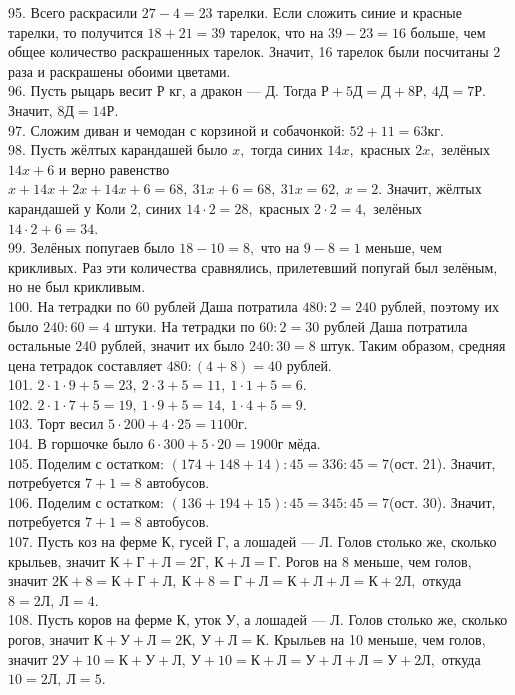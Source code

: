 \documentclass[12pt]{article}
\begin{document}
95. Всего раскрасили $27-4=23$ тарелки. Если сложить синие и красные тарелки, то получится $18+21=39$ тарелок, что на $39-23=16$ больше, чем общее количество раскрашенных тарелок. Значит, 16 тарелок были посчитаны 2 раза и раскрашены обоими цветами.\\
96. Пусть рыцарь весит Р кг, а дракон --- Д. Тогда $\text{Р}+5\text{Д}=\text{Д}+8\text{Р},\ 4\text{Д}=7\text{Р}.$ Значит, $8\text{Д}=14\text{Р}.$\\
97. Сложим диван и чемодан с корзиной и собачонкой: $52+11=63$кг.\\
98. Пусть жёлтых карандашей было $x,$ тогда синих $14x,$ красных $2x,$ зелёных $14x+6$ и верно равенство $x+14x+2x+14x+6=68,\ 31x+6=68,\ 31x=62,\ x=2.$ Значит, жёлтых карандашей у Коли 2, синих $14\cdot2=28,$ красных $2\cdot2=4,$ зелёных $14\cdot2+6=34.$\\
99. Зелёных попугаев было $18-10=8,$ что на $9-8=1$ меньше, чем крикливых. Раз эти количества сравнялись, прилетевший попугай был зелёным, но не был крикливым.\\
100. На тетрадки по 60 рублей Даша потратила $480:2=240$ рублей, поэтому их было $240:60=4$ штуки. На тетрадки по $60:2=30$ рублей Даша потратила остальные 240 рублей, значит их было $240:30=8$ штук. Таким образом, средняя цена тетрадок составляет $480:(4+8)=40$ рублей.\\
101. $2\cdot1\cdot9+5=23,\ 2\cdot3+5=11,\ 1\cdot1+5=6.$\\
102. $2\cdot1\cdot7+5=19,\ 1\cdot9+5=14,\ 1\cdot4+5=9.$\\
103. Торт весил $5\cdot200+4\cdot25=1100$г.\\
104. В горшочке было $6\cdot300+5\cdot20=1900$г мёда.\\
105. Поделим с остатком: $(174+148+14):45=336:45=7$(ост. 21). Значит, потребуется $7+1=8$ автобусов.\\
106. Поделим с остатком: $(136+194+15):45=345:45=7$(ост. 30). Значит, потребуется $7+1=8$ автобусов.\\
107. Пусть коз на ферме К, гусей Г, а лошадей --- Л. Голов столько же, сколько крыльев, значит $\text{К}+\text{Г}+\text{Л}=2\text{Г},\ \text{К}+\text{Л}=\text{Г}.$ Рогов на 8 меньше, чем голов, значит $2\text{К}+8=\text{К}+\text{Г}+\text{Л},\ \text{К}+8=\text{Г}+\text{Л}=\text{К}+\text{Л}+\text{Л}=\text{К}+2\text{Л},$ откуда $8=2\text{Л},\ \text{Л}=4.$\\
108. Пусть коров на ферме К, уток У, а лошадей --- Л. Голов столько же, сколько рогов, значит $\text{К}+\text{У}+\text{Л}=2\text{К},\ \text{У}+\text{Л}=\text{К}.$ Крыльев на 10 меньше, чем голов, значит $2\text{У}+10=\text{К}+\text{У}+\text{Л},\ \text{У}+10=\text{К}+\text{Л}=\text{У}+\text{Л}+\text{Л}=\text{У}+2\text{Л},$ откуда $10=2\text{Л},\ \text{Л}=5.$\\
\end{document}
